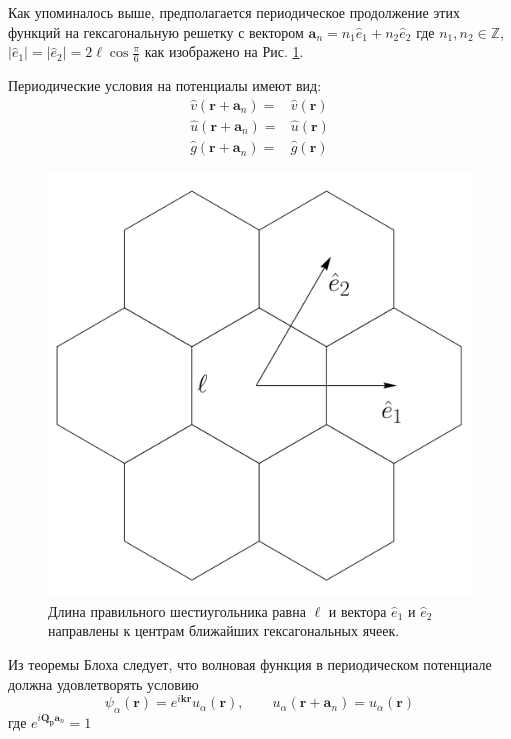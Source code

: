 \documentclass[a4paper,article,14pt]{extarticle}
\begin{document}
Как упоминалось выше, предполагается периодическое продолжение этих функций на гексагональную решетку с вектором $\mathbf{a}_n =   n_1 \hat {e}_1 + n_2 \hat {e}_2  $  где $n_1,n_2 \in \mathbb{Z}$, $|\hat {e}_1 |=|\hat {e}_2 |= 2 \ell \cos{\frac{\pi}{6}}$ как изображено на Рис. \ref{pic:hexagon_geometry}.

Периодические условия на потенциалы имеют вид:
\begin{equation}
\label{eq:periodic_potentials}
\begin{aligned}
\hat v(\mathbf{r} + \mathbf{a}_n) =& \hat v(\mathbf{r}) \\
\hat u(\mathbf{r} + \mathbf{a}_n) =&  \hat u(\mathbf{r}) \\
\hat g(\mathbf{r} + \mathbf{a}_n) =&  \hat g(\mathbf{r})
\end{aligned}
\end{equation}

\begin{figure}[t]
\centering	
\includegraphics[width=0.8\columnwidth]{images/geometry_lattice.pdf}
\caption{Длина правильного шестиугольника равна $\ell$ и вектора $\hat {e}_1$ и $\hat {e}_2$ направлены к центрам ближайших гексагональных ячеек. }
\label{pic:hexagon_geometry}
\end{figure}

\noindent Из теоремы Блоха\cite{landau} следует, что волновая функция в периодическом потенциале должна  удовлетворять условию
\begin{equation}
\label{eq:bloch_wave}
\psi_\alpha (\mathbf{r}) =  e^{i \mathbf{k} \mathbf{r}} u_ \alpha (\mathbf{r} ), \qquad u_ \alpha (\mathbf{r} + \mathbf{a}_n) = u_ \alpha (\mathbf{r})
\end{equation}
где $e^{i \mathbf{Q_p} \mathbf{a}_n }=1$
\end{document}
